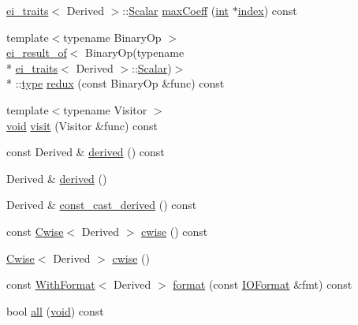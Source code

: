 \begin{DoxyCompactItemize}
\item 
\hyperlink{structei__traits}{ei\-\_\-traits}$<$ Derived $>$\-::\hyperlink{class_matrix_base_a625df8339dc2d816cbc0fd66e7dadaf5}{Scalar} \hyperlink{class_matrix_base_ad849e55818e8aa38b834047414f59c30}{max\-Coeff} (\hyperlink{ioapi_8h_a787fa3cf048117ba7123753c1e74fcd6}{int} $\ast$\hyperlink{glext_8h_ab47dd9958bcadea08866b42bf358e95e}{index}) const 
\item 
{\footnotesize template$<$typename Binary\-Op $>$ }\\\hyperlink{structei__result__of}{ei\-\_\-result\-\_\-of}$<$ Binary\-Op(typename \\*
\hyperlink{structei__traits}{ei\-\_\-traits}$<$ Derived $>$\-::\hyperlink{class_matrix_base_a625df8339dc2d816cbc0fd66e7dadaf5}{Scalar})$>$\\*
\-::\hyperlink{glext_8h_a7d05960f4f1c1b11f3177dc963a45d86}{type} \hyperlink{class_matrix_base_ad5e830e56b3f67a1796a553f44139e81}{redux} (const Binary\-Op \&func) const 
\item 
{\footnotesize template$<$typename Visitor $>$ }\\\hyperlink{group___u_a_v_objects_plugin_ga444cf2ff3f0ecbe028adce838d373f5c}{void} \hyperlink{class_matrix_base_a67e9a55a7fb7a5f59c9f3e5f34bf639f}{visit} (Visitor \&func) const 
\item 
const Derived \& \hyperlink{class_matrix_base_a73102c81700cb7428704e59900887688}{derived} () const 
\item 
Derived \& \hyperlink{class_matrix_base_a9f0c2628c23a7d01d85b9bd3704f0c0f}{derived} ()
\item 
Derived \& \hyperlink{class_matrix_base_aef3eb829bf60ad52531425ae3567621d}{const\-\_\-cast\-\_\-derived} () const 
\item 
const \hyperlink{class_cwise}{Cwise}$<$ Derived $>$ \hyperlink{class_matrix_base_af7878422bb2db0437229765c3c38f846}{cwise} () const 
\item 
\hyperlink{class_cwise}{Cwise}$<$ Derived $>$ \hyperlink{class_matrix_base_acb59453396d1eefa3781b404719d9602}{cwise} ()
\item 
const \hyperlink{class_with_format}{With\-Format}$<$ Derived $>$ \hyperlink{class_matrix_base_a450797ce64a44162dfd4a0cbb4ea6f16}{format} (const \hyperlink{struct_i_o_format}{I\-O\-Format} \&fmt) const 
\item 
bool \hyperlink{class_matrix_base_a2ef90a8a13862a65954e9f9f0a11efb7}{all} (\hyperlink{group___u_a_v_objects_plugin_ga444cf2ff3f0ecbe028adce838d373f5c}{void}) const 
\item 

\end{DoxyCompactItemize}
